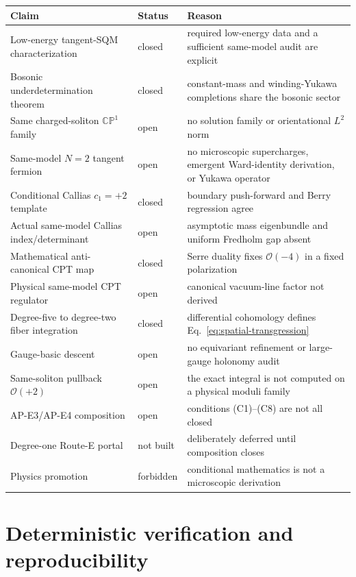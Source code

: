 \documentclass[11pt]{article}
\theoremstyle{definition}
\theoremstyle{remark}
\newcommand{\CP}{\mathbb {CP}}
\newcommand{\cO}{\mathcal O}
\newcommand{\status}[1]{\textcolor{blue!60!black}{\textsf{#1}}}
\begin{document}
\begin{longtable}{L{0.43\textwidth}L{0.16\textwidth}L{0.31\textwidth}}
\toprule
Claim & Status & Reason\\
\midrule
\endhead
Low-energy tangent-SQM characterization & \status{closed} & required
low-energy data and a sufficient same-model audit are explicit\\
Bosonic underdetermination theorem & \status{closed} & constant-mass and
winding-Yukawa completions share the bosonic sector\\
Same charged-soliton \(\CP^1\) family & \status{open} & no solution family or
orientational \(L^2\) norm\\
Same-model \(N=2\) tangent fermion & \status{open} & no microscopic
supercharges, emergent Ward-identity derivation, or Yukawa operator\\
Conditional Callias \(c_1=+2\) template & \status{closed} & boundary
push-forward and Berry regression agree\\
Actual same-model Callias index/determinant & \status{open} & asymptotic mass
eigenbundle and uniform Fredholm gap absent\\
Mathematical anti-canonical CPT map & \status{closed} & Serre duality fixes
\(\cO(-4)\) in a fixed polarization\\
Physical same-model CPT regulator & \status{open} & canonical vacuum-line
factor not derived\\
Degree-five to degree-two fiber integration & \status{closed} & differential
cohomology defines Eq.~\eqref{eq:spatial-transgression}\\
Gauge-basic descent & \status{open} & no equivariant refinement or large-gauge
holonomy audit\\
Same-soliton pullback \(\cO(+2)\) & \status{open} & the exact integral is not
computed on a physical moduli family\\
AP-E3/AP-E4 composition & \status{open} & conditions (C1)--(C8) are not all
closed\\
Degree-one Route-E portal & \status{not built} & deliberately deferred until
composition closes\\
Physics promotion & \status{forbidden} & conditional mathematics is not a
microscopic derivation\\
\bottomrule
\end{longtable}

\section{Deterministic verification and reproducibility}
\end{document}
